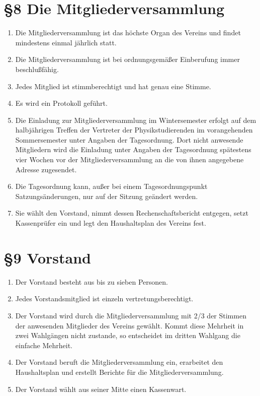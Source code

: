 \documentclass[ngerman]{article}
\begin{document}
\section*{§8 Die Mitgliederversammlung}
\begin{enumerate}
 \item Die Mitgliederversammlung ist das höchste Organ des Vereins und findet mindestens einmal jährlich statt.
 \item Die Mitgliederversammlung ist bei ordnungsgemäßer Einberufung immer
  beschlußfähig.
 \item Jedes Mitglied ist stimmberechtigt und hat genau eine Stimme.
 \item Es wird ein Protokoll geführt.
 \item Die Einladung zur Mitgliederversammlung im Wintersemester erfolgt auf dem halbjährigen Treffen der Vertreter der Physikstudierenden im vorangehenden Sommersemester unter
Angaben der Tagesordnung. Dort nicht
 anwesende Mitgliedern wird die Einladung unter
 Angaben der Tagesordnung spätestens vier Wochen vor der Mitgliederversammlung an die von ihnen angegebene Adresse zugesendet.
 \item Die Tagesordnung kann, außer bei einem Tagesordnungspunkt \glqq Satzungsänderungen\grqq, nur auf der Sitzung geändert werden.
 \item Sie wählt den Vorstand, nimmt dessen Rechenschaftsbericht entgegen, setzt Kassenprüfer ein und legt den Haushaltsplan des Vereins fest.
\end{enumerate}


\section*{§9 Vorstand}
\begin{enumerate}
 \item Der Vorstand besteht aus bis zu sieben Personen.
 \item Jedes Vorstandsmitglied ist einzeln vertretungsberechtigt.
 \item Der Vorstand wird durch die Mitgliederversammlung mit 2/3 der Stimmen der anwesenden Mitglieder des Vereins gewählt. Kommt diese Mehrheit in zwei Wahlgängen nicht zustande, so entscheidet im dritten Wahlgang die einfache Mehrheit.
 \item Der Vorstand beruft die Mitgliederversammlung ein, erarbeitet den Haushaltsplan und erstellt Berichte für die Mitgliederversammlung.
 \item Der Vorstand wählt aus seiner Mitte einen Kassenwart.
\end{enumerate}
\end{document}
